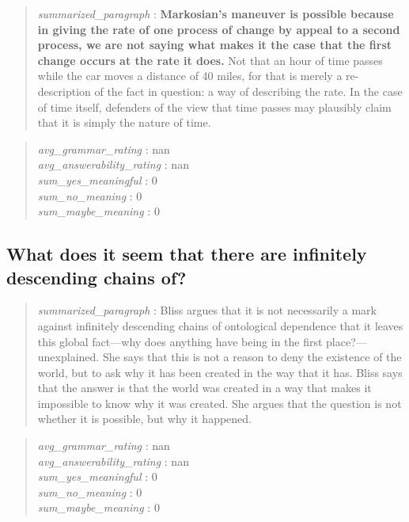\begin{quote}
\emph{summarized\_paragraph} : \textbf{Markosian's maneuver is possible
because in giving the rate of one process of change by appeal to a
second process, we are not saying what makes it the case that the first
change occurs at the rate it does.} Not that an hour of time passes
while the car moves a distance of 40 miles, for that is merely a
re-description of the fact in question: a way of describing the rate. In
the case of time itself, defenders of the view that time passes may
plausibly claim that it is simply the nature of time.
\end{quote}

\begin{quote}
\emph{avg\_grammar\_rating} : nan\\
\emph{avg\_answerability\_rating} : nan\\
\emph{sum\_yes\_meaningful} : 0\\
\emph{sum\_no\_meaning} : 0\\
\emph{sum\_maybe\_meaning} : 0
\end{quote}

\hypertarget{what-does-it-seem-that-there-are-infinitely-descending-chains-of}{%
\subsection{What does it seem that there are infinitely descending
chains
of?}\label{what-does-it-seem-that-there-are-infinitely-descending-chains-of}}

\begin{quote}
\emph{summarized\_paragraph} : Bliss argues that it is not necessarily a
mark against infinitely descending chains of ontological dependence that
it leaves this global fact---why does anything have being in the first
place?---unexplained. She says that this is not a reason to deny the
existence of the world, but to ask why it has been created in the way
that it has. Bliss says that the answer is that the world was created in
a way that makes it impossible to know why it was created. She argues
that the question is not whether it is possible, but why it happened.
\end{quote}

\begin{quote}
\emph{avg\_grammar\_rating} : nan\\
\emph{avg\_answerability\_rating} : nan\\
\emph{sum\_yes\_meaningful} : 0\\
\emph{sum\_no\_meaning} : 0\\
\emph{sum\_maybe\_meaning} : 0
\end{quote}
